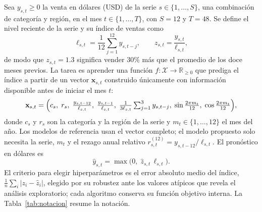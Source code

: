 \documentclass[pdflatex,sn-mathphys-num]{sn-jnl}
\theoremstyle{thmstyleone}
\begin{document}
Sea $y_{s,t}\ge 0$ la venta en dólares (USD) de la serie $s\in\{1,\dots,S\}$, una combinación de categoría y región, en el mes $t\in\{1,\dots,T\}$, con $S=12$ y $T=48$. Se define el nivel reciente de la serie y su índice de ventas como
\begin{equation}
\ell_{s,t}=\frac{1}{12}\sum_{j=1}^{12}y_{s,t-j},\qquad z_{s,t}=\frac{y_{s,t}}{\ell_{s,t}},
\label{eq:indice}
\end{equation}
de modo que $z_{s,t}=1.3$ significa vender 30\% más que el promedio de los doce meses previos. La tarea es aprender una función $f:\mathcal{X}\to\mathbb{R}_{\ge 0}$ que prediga el índice a partir de un vector $\mathbf{x}_{s,t}$ construido únicamente con información disponible antes de iniciar el mes $t$:
\begin{equation}
\mathbf{x}_{s,t}=\Bigl(c_s,\;r_s,\;\tfrac{y_{s,t-12}}{\ell_{s,t}},\;\tfrac{y_{s,t-1}}{\ell_{s,t}},\;\tfrac{1}{3\ell_{s,t}}\textstyle\sum_{j=1}^{3}y_{s,t-j},\;\sin\tfrac{2\pi m_t}{12},\;\cos\tfrac{2\pi m_t}{12}\Bigr),
\label{eq:x}
\end{equation}
donde $c_s$ y $r_s$ son la categoría y la región de la serie y $m_t\in\{1,\dots,12\}$ el mes del año. Los modelos de referencia usan el vector completo; el modelo propuesto solo necesita la serie, $m_t$ y el rezago anual relativo $r^{(12)}_{s,t}=y_{s,t-12}/\ell_{s,t}$. El pronóstico en dólares es
\begin{equation}
\hat{y}_{s,t}=\max\bigl(0,\;\hat{z}_{s,t}\,\ell_{s,t}\bigr).
\label{eq:retorno}
\end{equation}
El criterio para elegir hiperparámetros es el error absoluto medio del índice, $\frac{1}{n}\sum_i|z_i-\hat{z}_i|$, elegido por su robustez ante los valores atípicos que revela el análisis exploratorio; cada algoritmo conserva su función objetivo interna. La Tabla~\ref{tab:notacion} resume la notación.
\end{document}

